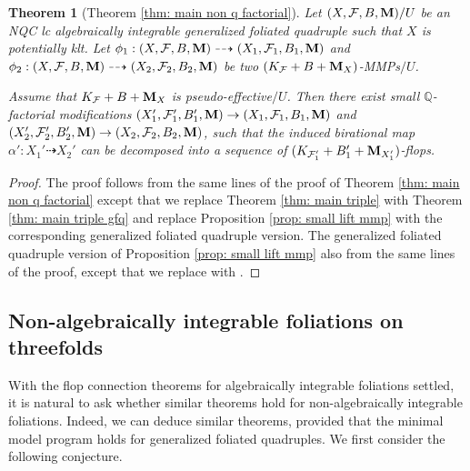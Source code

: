 \documentclass[11pt]{amsart}
\numberwithin{equation}{section}
\newcommand{\Mm}{{\bf{M}}}
\newcommand{\Qq}{\mathbb{Q}}
\newcommand{\Ff}{\mathcal{F}}
\newtheorem{thm}{Theorem}[section]
\theoremstyle{definition}
\theoremstyle{definition}
\theoremstyle{definition}
\begin{document}
\begin{thm}[Theorem \ref{thm: main non q factorial}]\label{thm: main non q factorial gfq}
Let $(X,\Ff,B,\Mm)/U$ be an NQC lc algebraically integrable generalized foliated quadruple such that $X$ is potentially klt. Let $\phi_1: (X,\Ff,B,\Mm)\dashrightarrow (X_1,\Ff_1,B_1,\Mm)$ and $\phi_2: (X,\Ff,B,\Mm)\dashrightarrow (X_2,\Ff_2,B_2,\Mm)$ be two $(K_{\Ff}+B+\Mm_X)$-MMPs$/U$. 

Assume that $K_{\Ff}+B+\Mm_X$ is pseudo-effective$/U$. Then there exist small $\Qq$-factorial modifications $(X_1',\Ff_1',B_1',\Mm)\rightarrow (X_1,\Ff_1,B_1,\Mm)$ and $(X_2',\Ff_2',B_2',\Mm)\rightarrow (X_2,\Ff_2,B_2,\Mm)$, such that the induced birational map $\alpha': X_1'\dashrightarrow X_2'$ can be decomposed into a sequence of $(K_{\Ff_1'}+B_1'+\Mm_{X_1'})$-flops.
\end{thm}
\begin{proof}
    The proof follows from the same lines of the proof of Theorem \ref{thm: main non q factorial} except that we replace Theorem \ref{thm: main triple} with Theorem \ref{thm: main triple gfq} and replace Proposition \ref{prop: small lift mmp} with the corresponding generalized foliated quadruple version. The generalized foliated quadruple version of Proposition \ref{prop: small lift mmp} also from the same lines of the proof, except that we replace \cite[Theorem 1.11]{LMX24b} with \cite[Theorem A.13]{LMX24b}.
\end{proof}

\subsection{Non-algebraically integrable foliations on threefolds}

With the flop connection theorems for algebraically integrable foliations settled, it is natural to ask whether similar theorems hold for non-algebraically integrable foliations. Indeed, we can deduce similar theorems, provided that the minimal model program holds for generalized foliated quadruples. We first consider the following conjecture.
\end{document}
